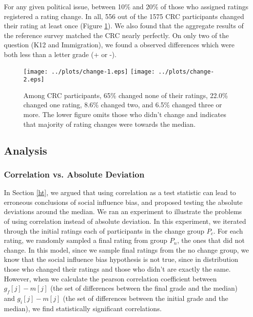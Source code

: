 For any given political issue, between 10\% and 20\% of those who assigned ratings registered a rating change.
In all, 556 out of the 1575 CRC participants changed their rating at least once (Figure \ref{change-1}).
We also found that the aggregate results of the reference survey matched the CRC nearly perfectly.
On only two of the question (K12 and Immigration), we found a observed differences which were both less than a letter grade (+ or -).

\begin{figure}[h]
\hspace*{-2em}
    \texttt{[image: ../plots/change-1.eps]}
    \hspace*{-2em}
    \texttt{[image: ../plots/change-2.eps]}
      \caption{Among CRC participants, 65\% changed none of their ratings, 22.0\% changed one rating, 8.6\% changed two, and 6.5\% changed three or more. The lower figure omits those who didn't change and indicates that majority of rating changes were towards the median.}
      \label{change-1}
      \vspace{2em}
\end{figure}

\subsection{Analysis}

\subsubsection{Correlation vs. Absolute Deviation}
\label{exp-robust}
In Section \ref{ht}, we argued that using correlation as a test statistic can lead to erroneous conclusions of social influence bias, and proposed testing the absolute deviations around the median.
We ran an experiment to illustrate the problems of using correlation instead of absolute deviation.
In this experiment, we iterated through the initial ratings each of participants in the change group $P_c$.
For each rating, we randomly sampled a final rating from group $P_n$, the ones that did not change.
In this model, since we sample final ratings from the no change group, we know that the social influence bias hypothesis is not true, since in distribution those who changed their ratings and those who didn't are exactly the same.
However, when we calculate the pearson correlation coefficient between $g_f[j] - m[j]$ (the set of differences between the final grade and the median) and $g_i[j] - m[j]$ (the set of differences between the initial grade and the median), we find statistically significant correlations.

